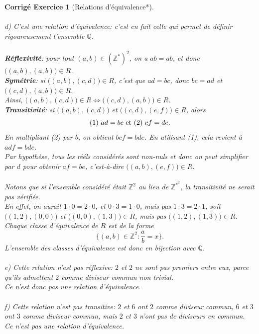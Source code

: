 \documentclass[11pt,french,table]{article}
\theoremstyle{exercice}
\theoremstyle{corrigé}
\newtheorem{corrigé}{Corrigé Exercice}
\begin{document}
\begin{corrigé}[Relations d'équivalence*]
    \\ \\
    d) C'est une relation d'équivalence: c'est en fait celle qui permet de définir rigoureusement l'ensemble $\mathbb{Q}$. \\ \\
    \textbf{Réflexivité}: pour tout $(a,b) \in (\mathbb{Z}^*)^2$, on a $ab = ab$, et donc $\big((a,b),(a,b)\big) \in R$. \\
    \textbf{Symétrie}: si $\big((a,b),(c,d)\big) \in R$, c'est que $ad=bc$, donc $bc=ad$ et $\big((c,d),(a,b)\big) \in R$. \\
    Ainsi, $\big((a,b),(c,d)\big) \in R \iff \big((c,d),(a,b)\big) \in R$. \\
   \textbf{Transitivité}: si $\big((a,b),(c,d)\big)$ et $\big((c,d),(e,f)\big) \in R$, alors $$\textnormal{(1) } ad=bc \text{ et (2) } cf=de.$$
    En multipliant (2) par $b$, on obtient $bcf=bde$. En utilisant (1), cela revient à $adf=bde$. \\
    Par hypothèse, tous les rééls considérés sont non-nuls et donc on peut simplifier par $d$ pour obtenir $af=be$, c'est-à-dire $\big((a,b),(e,f)\big) \in R$. \\
    \\
    Notons que si l'ensemble considéré était $\mathbb{Z}^2$ au lieu de $\mathbb{Z}^*^2$, la transitivité ne serait pas vérifiée. \\
    En effet, on aurait $1 \cdot 0 = 2 \cdot 0$, et $0 \cdot 3 = 1 \cdot 0$, mais pas $1 \cdot 3 = 2 \cdot 1$, soit
    $\big((1,2),(0,0)\big)$ et $\big((0,0),(1,3)\big) \in R$, mais pas $\big((1,2),(1,3)\big) \in R$. \\
    Chaque classe d'équivalence de $R$ est de la forme $$\{ (a,b) \in \mathbb{Z}^2 : \dfrac{a}{b} = x\}.$$
    L'ensemble des classes d'équivalence est donc en bijection avec $\mathbb{Q}$. \\
    \\
    e) Cette relation n'est pas réflexive: $2$ et $2$ ne sont pas premiers entre eux, parce qu'ils admettent $2$ comme diviseur commun non trivial. \\
    Ce n'est donc pas une relation d'équivalence. \\ \\
    f) Cette relation n'est pas transitive: $2$ et $6$ ont $2$ comme diviseur commun, $6$ et $3$ ont $3$ comme diviseur commun, mais $2$ et $3$ n'ont pas de diviseurs en commun. \\
    Ce n'est pas une relation d'équivalence. \\

\end{corrigé}
\end{document}
